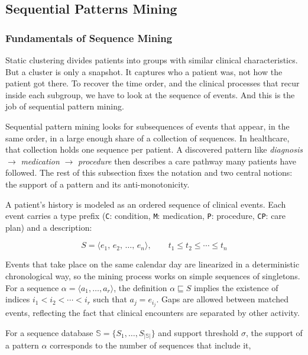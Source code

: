 \subsection{Sequential Patterns Mining}
\label{ch:prefix_span_theory}

\subsubsection*{Fundamentals of Sequence Mining}

Static clustering divides patients into groups with similar clinical characteristics. But a cluster is only a snapshot. It captures who a patient was, not how the patient got there. To recover the time order, and the clinical processes that recur inside each subgroup, we have to look at the sequence of events. And this is the job of sequential pattern mining.

Sequential pattern mining looks for subsequences of events that appear, in the same order, in a large enough share of a collection of sequences. In healthcare, that collection holds one sequence per patient. A discovered pattern like \emph{diagnosis} $\to$ \emph{medication} $\to$ \emph{procedure} then describes a care pathway many patients have followed. The rest of this subsection fixes the notation and two central notions: the support of a pattern and its anti-monotonicity.

A patient's history is modeled as an ordered sequence of clinical events. Each event carries a type prefix (\texttt{C}: condition, \texttt{M}: medication, \texttt{P}: procedure, \texttt{CP}: care plan) and a description:

\begin{equation}
    S = \langle e_1,\, e_2,\, \ldots,\, e_n \rangle, \qquad t_1 \leq t_2 \leq \cdots \leq t_n
    \label{eq:sequence}
\end{equation}

Events that take place on the same calendar day are linearized in a deterministic chronological way, so the mining process works on simple sequences of singletons. For a sequence $\alpha = \langle a_1, \ldots, a_r \rangle$, the definition $\alpha \sqsubseteq S$ implies the existence of indices $i_1 < i_2 < \cdots < i_r$ such that $a_j = e_{i_j}$. Gaps are allowed between matched events, reflecting the fact that clinical encounters are separated by other activity.

For a sequence database $\mathbb{S} = \{S_1, \ldots, S_{|\mathbb{S}|}\}$ and support threshold $\sigma$, the support of a pattern $\alpha$ corresponds to the number of sequences that include it,

